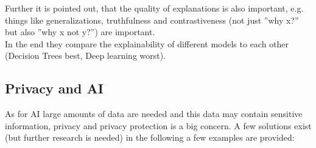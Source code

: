 \documentclass[12pt,a4paper]{article}
\begin{document}
\noindent Further it is pointed out, that the quality of explanations is also important, e.g. things like generalizations, truthfulness and contrastiveness (not just ''why x?'' but also ''why x not y?'') are important.\\
In the end they compare the explainability of different models to each other (Decision Trees best, Deep learning worst).

\subsection{Privacy and AI}

\noindent As for AI large amounts of data are needed and this data may contain sensitive information, privacy and privacy protection is a big concern. A few solutions exist (but further research is needed) in the following a few examples are provided:
\end{document}
